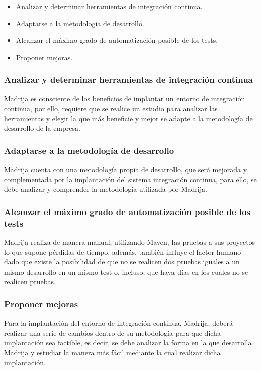 \documentclass{pre-tfg}
\begin{document}
\begin{itemize}
\item Analizar y determinar herramientas de integración continua.
\item Adaptarse a la metodología de desarrollo.
\item Alcanzar el máximo grado de automatización posible de los tests.
\item Proponer mejoras.
\end{itemize}

\subsubsection{Analizar y determinar herramientas de integración continua}
Madrija es consciente de los beneficios de implantar un entorno de integración continua, por ello, requiere que se realice un estudio para analizar las herramientas y elegir la que más beneficie y mejor se adapte a la metodología de desarrollo de la empresa.

\subsubsection{Adaptarse a la metodología de desarrollo}

Madrija cuenta con una metodología propia de desarrollo, que será mejorada y complementada por la implantación del sistema integración continua, para ello, se debe analizar y comprender la metodología utilizada por Madrija.

\subsubsection{Alcanzar el máximo grado de automatización posible de los tests}

Madrija realiza de manera manual, utilizando Maven, las pruebas a sus proyectos lo que supone pérdidas de tiempo, además, también influye el factor humano dado que existe la posibilidad de que no se realicen dos pruebas iguales a un mismo desarrollo en un mismo test o, incluso, que haya días en los cuales no se realicen pruebas.

\subsubsection{Proponer mejoras}

Para la implantación del entorno de integración continua, Madrija, deberá realizar una serie de cambios dentro de su metodología para que dicha implantación sea factible, es decir, se debe analizar la forma en la que desarrolla Madrija y estudiar la manera más fácil mediante la cual realizar dicha implantación.
\end{document}
